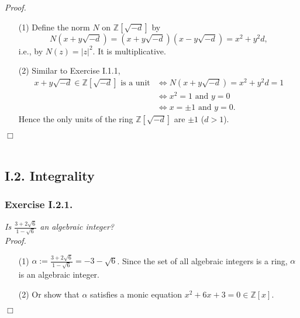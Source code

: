 \documentclass{article}
\begin{document}
\emph{Proof.}
\begin{enumerate}
\item[(1)]
  Define the norm $N$ on $\mathbb{Z}[\sqrt{-d}]$ by
  \[
    N(x+y\sqrt{-d}) = (x+y\sqrt{-d})(x-y\sqrt{-d}) = x^2 + y^2 d,
  \]
  i.e., by $N(z) = |z|^2$.
  It is multiplicative.

\item[(2)]
  Similar to Exercise I.1.1,
  \begin{align*}
    \text{$x+y\sqrt{-d} \in \mathbb{Z}[\sqrt{-d}]$ is a unit}
    &\Longleftrightarrow
    N(x+y\sqrt{-d}) = x^2 + y^2 d = 1 \\
    &\Longleftrightarrow
    x^2 = 1 \text{ and } y = 0 \\
    &\Longleftrightarrow
    x = \pm 1 \text{ and } y = 0.
  \end{align*}
  Hence the only units of the ring $\mathbb{Z}[\sqrt{-d}]$ are $\pm 1$ ($d > 1$).
\end{enumerate}
$\Box$ \\\\






\subsection*{I.2. Integrality \\}



\subsubsection*{Exercise I.2.1.}
\emph{Is $\frac{3+2\sqrt{6}}{1-\sqrt{6}}$ an algebraic integer?} \\



\emph{Proof.}
\begin{enumerate}
\item[(1)]
  $\alpha := \frac{3+2\sqrt{6}}{1-\sqrt{6}} = -3-\sqrt{6}$.
  Since the set of all algebraic integers is a ring,
  $\alpha$ is an algebraic integer.

\item[(2)]
  Or show that $\alpha$ satisfies a monic equation $x^2 + 6x + 3 = 0 \in \mathbb{Z}[x]$.
\end{enumerate}
$\Box$ \\\\
\end{document}
